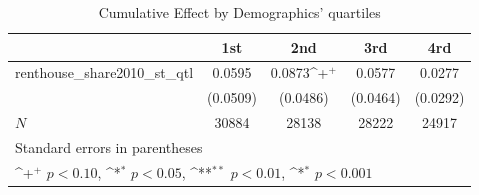 \begin{table}[htbp]\centering
\def\sym#1{\ifmmode^{#1}\else\(^{#1}\)\fi}
\caption{Cumulative Effect by Demographics' quartiles}
\begin{tabular}{l*{4}{c}}
\hline\hline
            &\multicolumn{1}{c}{1st}&\multicolumn{1}{c}{2nd}&\multicolumn{1}{c}{3rd}&\multicolumn{1}{c}{4rd}\\
\hline
renthouse\_share2010\_st\_qtl&      0.0595       &      0.0873\sym{+}&      0.0577       &      0.0277       \\
            &    (0.0509)       &    (0.0486)       &    (0.0464)       &    (0.0292)       \\
\hline
\(N\)       &       30884       &       28138       &       28222       &       24917       \\
\hline\hline
\multicolumn{5}{l}{\footnotesize Standard errors in parentheses}\\
\multicolumn{5}{l}{\footnotesize \sym{+} \(p<0.10\), \sym{*} \(p<0.05\), \sym{**} \(p<0.01\), \sym{*} \(p<0.001\)}\\
\end{tabular}
\end{table}
